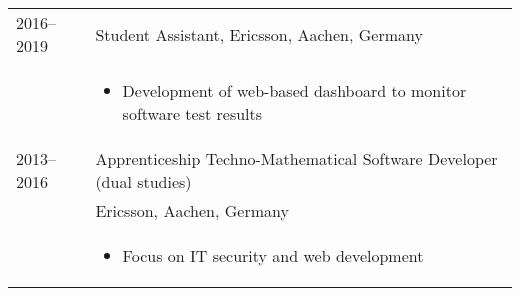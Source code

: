 
\begin{longtable}[l]{@{}p{} p{}}
    2016--2019 & Student Assistant, Ericsson, Aachen, Germany\\
    & \begin{itemize}
        \item \raggedright Development of web-based dashboard to monitor software test results
    \end{itemize}\\
    2013--2016 & Apprenticeship Techno-Mathematical Software Developer (dual studies)\\
               & Ericsson, Aachen, Germany\\
    & \begin{itemize}
        \item \raggedright Focus on IT security and web development
    \end{itemize}


\end{longtable}